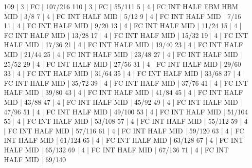 109   |  3     |    FC                                        | 107/216   
110   |  3     |    FC                                        | 55/111   
5     |  4     |    FC  INT  HALF  EBM  HBM  MID              | 3/8   
7     |  4     |    FC  INT  HALF            MID              | 5/12   
9     |  4     |    FC  INT  HALF            MID              | 7/16   
11    |  4     |    FC  INT  HALF            MID              | 9/20   
13    |  4     |    FC  INT  HALF            MID              | 11/24   
15    |  4     |    FC  INT  HALF            MID              | 13/28   
17    |  4     |    FC  INT  HALF            MID              | 15/32   
19    |  4     |    FC  INT  HALF            MID              | 17/36   
21    |  4     |    FC  INT  HALF            MID              | 19/40   
23    |  4     |    FC  INT  HALF            MID              | 21/44   
25    |  4     |    FC  INT  HALF            MID              | 23/48   
27    |  4     |    FC  INT  HALF            MID              | 25/52   
29    |  4     |    FC  INT  HALF            MID              | 27/56   
31    |  4     |    FC  INT  HALF            MID              | 29/60   
33    |  4     |    FC  INT  HALF            MID              | 31/64   
35    |  4     |    FC  INT  HALF            MID              | 33/68   
37    |  4     |    FC  INT  HALF            MID              | 35/72   
39    |  4     |    FC  INT  HALF            MID              | 37/76   
41    |  4     |    FC  INT  HALF            MID              | 39/80   
43    |  4     |    FC  INT  HALF            MID              | 41/84   
45    |  4     |    FC  INT  HALF            MID              | 43/88   
47    |  4     |    FC  INT  HALF            MID              | 45/92   
49    |  4     |    FC  INT  HALF            MID              | 47/96   
51    |  4     |    FC  INT  HALF            MID              | 49/100   
53    |  4     |    FC  INT  HALF            MID              | 51/104   
55    |  4     |    FC  INT  HALF            MID              | 53/108   
57    |  4     |    FC  INT  HALF            MID              | 55/112   
59    |  4     |    FC  INT  HALF            MID              | 57/116   
61    |  4     |    FC  INT  HALF            MID              | 59/120   
63    |  4     |    FC  INT  HALF            MID              | 61/124   
65    |  4     |    FC  INT  HALF            MID              | 63/128   
67    |  4     |    FC  INT  HALF            MID              | 65/132   
69    |  4     |    FC  INT  HALF            MID              | 67/136   
71    |  4     |    FC  INT  HALF            MID              | 69/140   
